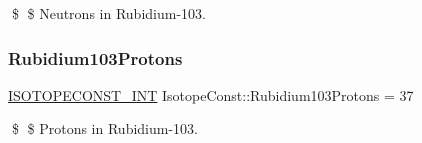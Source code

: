 \$ \$ Neutrons in Rubidium-\/103. \mbox{\label{group___isotope_const-_rubidium-_rb103_ga613d6bec3f78291658de358c38bcf7df}} 
\subsubsection{\texorpdfstring{Rubidium103\+Protons}{Rubidium103Protons}}
{\footnotesize\ttfamily \mbox{\hyperlink{group___isotope_const-_macros_ga5f18360b3e99483a35c32d789e62621c}{I\+S\+O\+T\+O\+P\+E\+C\+O\+N\+S\+T\+\_\+\+I\+NT}} Isotope\+Const\+::\+Rubidium103\+Protons = 37}

\$ \$ Protons in Rubidium-\/103. 
